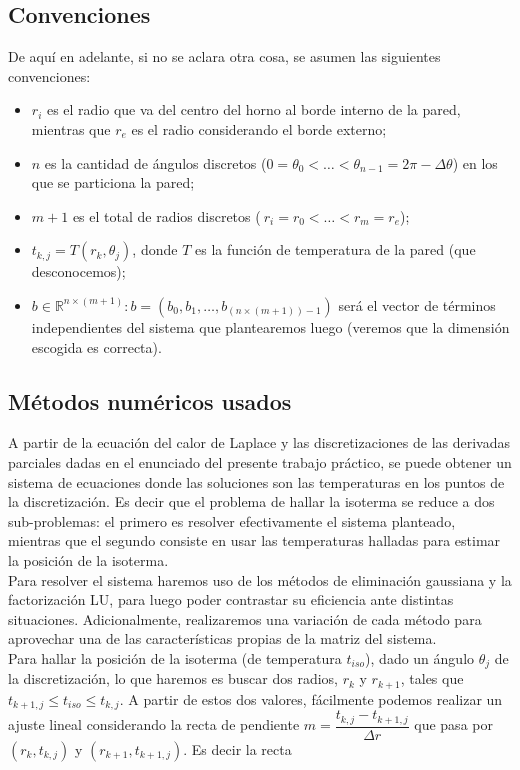 \subsection{Convenciones}
De aquí en adelante, si no se aclara otra cosa, se asumen las siguientes convenciones:
\begin{itemize}
\item$r_i$ es el radio que va del centro del horno al borde interno de la pared, mientras que $r_e$ es el radio considerando el borde externo;
\item$n$ es la cantidad de ángulos discretos ($0=\theta_0 <\hdots< \theta_{n-1} = 2\pi - \Delta \theta$) en los que se particiona la pared;
\item$m+1$ es el total de radios discretos ($~{r_i=r_0<\hdots<r_m=r_e}$); 
\item$t_{k,j} = T(r_k, \theta_j)$, donde $T$ es la función de temperatura de la pared (que desconocemos);
\item$b\in \mathbb{R}^{n\times (m+1)}: b = (b_0, b_1, \hdots, b_{(n\times (m+1))-1})$ será el vector de términos independientes del sistema que plantearemos luego (veremos que la dimensión escogida es correcta). 
\end{itemize}
\subsection{Métodos numéricos usados}
\label{sec:metodos}
A partir de la ecuación del calor de Laplace y las discretizaciones de las derivadas parciales dadas en el enunciado del presente trabajo práctico, se puede obtener un sistema de ecuaciones donde las soluciones son las temperaturas en los puntos de la discretización. 
Es decir que el problema de hallar la isoterma se reduce a dos sub-problemas: el primero es resolver efectivamente el sistema planteado, mientras que el segundo consiste en usar las temperaturas halladas para estimar la posición de la isoterma.\\
Para resolver el sistema haremos uso de los métodos de eliminación gaussiana y la factorización LU, para luego poder contrastar su eficiencia ante distintas situaciones. Adicionalmente, realizaremos una variación de cada método para aprovechar una de las características propias de la matriz del sistema.\\
Para hallar la posición de la isoterma (de temperatura $t_{iso}$), dado un ángulo $\theta_j$ de la discretización, lo que haremos es buscar dos radios, $r_k$ y $r_{k+1}$, tales que $t_{k+1,j} \leq t_{iso} \leq t_{k, j}$. A partir de estos dos valores, fácilmente podemos realizar un ajuste lineal considerando la recta de pendiente $m = \dfrac{t_{k,j}-t_{k+1,j}}{\Delta r}$ que pasa por $(r_k,t_{k,j})$ y $(r_{k+1}, t_{k+1,j})$. Es decir la recta

